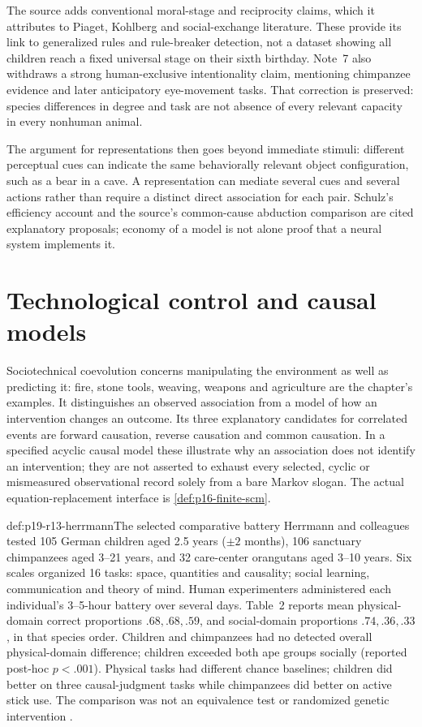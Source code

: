 The source adds conventional moral-stage and reciprocity claims, which it
attributes to Piaget, Kohlberg and social-exchange literature. These provide
its link to generalized rules and rule-breaker detection, not a dataset
showing all children reach a fixed universal stage on their sixth birthday.
Note~7 also withdraws a strong human-exclusive intentionality claim,
mentioning chimpanzee evidence and later anticipatory eye-movement tasks.
That correction is preserved: species differences in degree and task are
not absence of every relevant capacity in every nonhuman animal.

The argument for representations then goes beyond immediate stimuli:
different perceptual cues can indicate the same behaviorally relevant object
configuration, such as a bear in a cave. A representation can mediate several
cues and several actions rather than require a distinct direct association
for each pair. Schulz's efficiency account and the source's common-cause
abduction comparison are cited explanatory proposals; economy of a model
is not alone proof that a neural system implements it.

\section{Technological control and causal models}
\label{sec:p19-r13-causal}

Sociotechnical coevolution concerns manipulating the environment as well as
predicting it: fire, stone tools, weaving, weapons and agriculture are the
chapter's examples. It distinguishes an observed association from a model
of how an intervention changes an outcome. Its three explanatory candidates
for correlated events are forward causation, reverse causation and common
causation. In a specified acyclic causal model these illustrate why an
association does not identify an intervention; they are not asserted to
exhaust every selected, cyclic or mismeasured observational record solely
from a bare Markov slogan. The actual equation-replacement interface is
\cref{def:p16-finite-scm}.

\begin{hbdefinition}{def:p19-r13-herrmann}{The selected comparative battery}
Herrmann and colleagues tested 105 German children aged 2.5 years
(\(\pm2\) months), 106 sanctuary chimpanzees aged 3--21 years,
and 32 care-center orangutans aged 3--10 years. Six scales organized
16 tasks: space, quantities and causality; social learning, communication
and theory of mind. Human experimenters administered each individual's
3--5-hour battery over several days. Table~2 reports mean physical-domain
correct proportions \(.68,.68,.59\), and social-domain proportions
\(.74,.36,.33\), in that species order. Children and chimpanzees had no
detected overall physical-domain difference; children exceeded both ape
groups socially (reported post-hoc \(p<.001\)). Physical tasks had different
chance baselines; children did better on three causal-judgment tasks while
chimpanzees did better on active stick use. The comparison was not an
equivalence test or randomized genetic intervention
\cite[pp.~1360--1366, Tables~1--2]{R13HerrmannEtAl2007}.
\end{hbdefinition}

